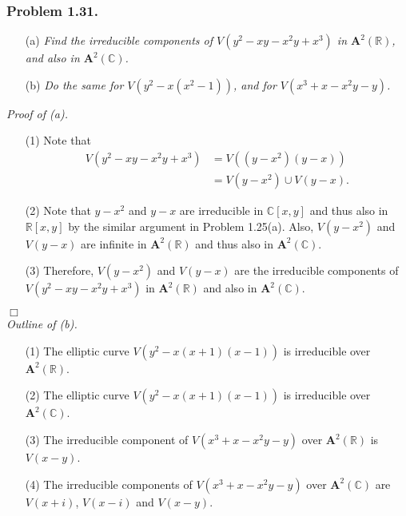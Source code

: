 \documentclass{article}
\begin{document}



\subsubsection*{Problem 1.31.}
\begin{enumerate}
\item[(a)]
  \emph{Find the irreducible components of $V(y^2-xy-x^2y+x^3)$ in $\mathbf{A}^2(\mathbb{R})$,
  and also in $\mathbf{A}^2(\mathbb{C})$.}

\item[(b)]
  \emph{Do the same for $V(y^2 - x(x^2-1))$, and for $V(x^3+x-x^2y-y)$.} \\
\end{enumerate}



\emph{Proof of (a).}
\begin{enumerate}
\item[(1)]
  Note that
  \begin{align*}
    V(y^2-xy-x^2y+x^3)
    &= V((y-x^2)(y - x)) \\
    &= V(y-x^2) \cup V(y - x).
  \end{align*}

\item[(2)]
  Note that $y-x^2$ and $y-x$ are irreducible in $\mathbb{C}[x,y]$
  and thus also in $\mathbb{R}[x,y]$
  by the similar argument in Problem 1.25(a).
  Also, $V(y-x^2)$ and $V(y - x)$ are infinite in $\mathbf{A}^2(\mathbb{R})$
  and thus also in $\mathbf{A}^2(\mathbb{C})$.

\item[(3)]
  Therefore,
  $V(y-x^2)$ and $V(y - x)$ are the irreducible components of $V(y^2-xy-x^2y+x^3)$
  in $\mathbf{A}^2(\mathbb{R})$ and also in $\mathbf{A}^2(\mathbb{C})$.
\end{enumerate}
$\Box$ \\



\emph{Outline of (b).}
\begin{enumerate}
\item[(1)]
  The elliptic curve $V(y^2 - x(x+1)(x-1))$ is irreducible over $\mathbf{A}^2(\mathbb{R})$.

\item[(2)]
  The elliptic curve $V(y^2 - x(x+1)(x-1))$ is irreducible over $\mathbf{A}^2(\mathbb{C})$.

\item[(3)]
  The irreducible component of $V(x^3+x-x^2y-y)$ over $\mathbf{A}^2(\mathbb{R})$ is $V(x - y)$.

\item[(4)]
  The irreducible components of $V(x^3+x-x^2y-y)$ over $\mathbf{A}^2(\mathbb{C})$ are
  $V(x + i)$, $V(x - i)$ and $V(x - y)$. \\
\end{enumerate}
\end{document}
